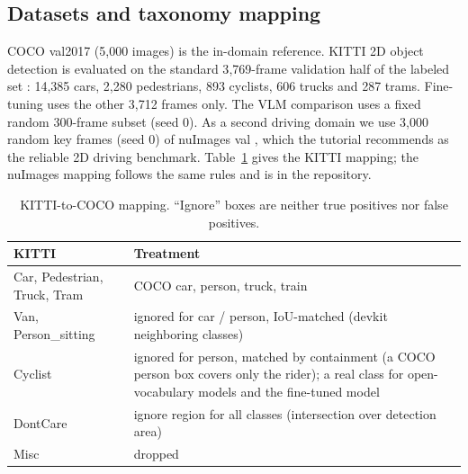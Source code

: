 \documentclass[conference]{IEEEtran}
\begin{document}
\subsection{Datasets and taxonomy mapping}
COCO val2017 (5{,}000 images) is the in-domain reference. KITTI 2D object detection \cite{geiger2012kitti} is
evaluated on the standard 3{,}769-frame validation half of the labeled set \cite{chen2015_3dop}: 14{,}385 cars,
2{,}280 pedestrians, 893 cyclists, 606 trucks and 287 trams. Fine-tuning uses the other 3{,}712 frames only. The
VLM comparison uses a fixed random 300-frame subset (seed 0). As a second driving domain we use 3{,}000 random
key frames (seed 0) of nuImages val \cite{caesar2020nuscenes}, which the tutorial recommends as the reliable 2D
driving benchmark. Table~\ref{tab:mapping} gives the KITTI mapping; the nuImages mapping follows the same rules and
is in the repository.

\begin{table}[t]
\centering
\caption{KITTI-to-COCO mapping. ``Ignore'' boxes are neither true positives nor false positives.}
\label{tab:mapping}
\footnotesize
\begin{tabular}{@{}p{2.3cm}p{5.5cm}@{}}
\toprule
KITTI & Treatment \\
\midrule
Car, Pedestrian, Truck, Tram & COCO car, person, truck, train \\
Van, Person\_sitting & ignored for car / person, IoU-matched (devkit neighboring classes) \\
Cyclist & ignored for person, matched by containment (a COCO person box covers only the rider); a real class for open-vocabulary models and the fine-tuned model \\
DontCare & ignore region for all classes (intersection over detection area) \\
Misc & dropped \\
\bottomrule
\end{tabular}
\end{table}
\end{document}
